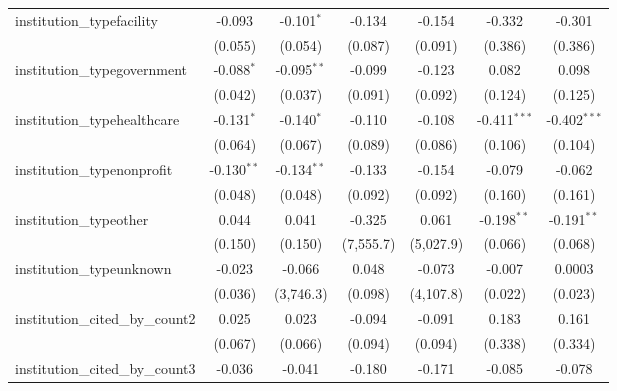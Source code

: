 \begin{tabular}{lcccccc}
   institution\_typefacility             & -0.093         & -0.101$^{*}$  & -0.134        & -0.154        & -0.332         & -0.301\\   
                                         & (0.055)        & (0.054)       & (0.087)       & (0.091)       & (0.386)        & (0.386)\\   
   institution\_typegovernment           & -0.088$^{*}$   & -0.095$^{**}$ & -0.099        & -0.123        & 0.082          & 0.098\\   
                                         & (0.042)        & (0.037)       & (0.091)       & (0.092)       & (0.124)        & (0.125)\\   
   institution\_typehealthcare           & -0.131$^{*}$   & -0.140$^{*}$  & -0.110        & -0.108        & -0.411$^{***}$ & -0.402$^{***}$\\   
                                         & (0.064)        & (0.067)       & (0.089)       & (0.086)       & (0.106)        & (0.104)\\   
   institution\_typenonprofit            & -0.130$^{**}$  & -0.134$^{**}$ & -0.133        & -0.154        & -0.079         & -0.062\\   
                                         & (0.048)        & (0.048)       & (0.092)       & (0.092)       & (0.160)        & (0.161)\\   
   institution\_typeother                & 0.044          & 0.041         & -0.325        & 0.061         & -0.198$^{**}$  & -0.191$^{**}$\\   
                                         & (0.150)        & (0.150)       & (7,555.7)     & (5,027.9)     & (0.066)        & (0.068)\\   
   institution\_typeunknown              & -0.023         & -0.066        & 0.048         & -0.073        & -0.007         & 0.0003\\   
                                         & (0.036)        & (3,746.3)     & (0.098)       & (4,107.8)     & (0.022)        & (0.023)\\   
   institution\_cited\_by\_count2        & 0.025          & 0.023         & -0.094        & -0.091        & 0.183          & 0.161\\   
                                         & (0.067)        & (0.066)       & (0.094)       & (0.094)       & (0.338)        & (0.334)\\   
   institution\_cited\_by\_count3        & -0.036         & -0.041        & -0.180        & -0.171        & -0.085         & -0.078\\   

\end{tabular}
